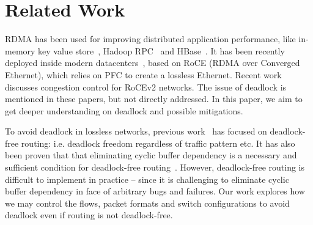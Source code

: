 \secspacelarge
\section{Related Work}
\secspace

 RDMA has been used for improving distributed
application performance, like in-memory key value store~\cite{mitchell13atc,
farm, kalia14sigcomm}, Hadoop RPC~\cite{hadooprdma} and HBase~\cite{hbaserdma}.
It has been recently deployed inside modern
datacenters~\cite{timely,dcqcn,rdmascale}, based on RoCE (RDMA over Converged
Ethernet), which relies on PFC to create a lossless Ethernet.  Recent
work~\cite{timely,dcqcn} discusses congestion control for RoCEv2
networks. The issue of deadlock is mentioned in these papers, but not directly
addressed. In this paper, we aim to get deeper understanding on deadlock and
possible mitigations.

 To avoid deadlock in lossless networks, previous
work~\cite{tcpbolt,karol2003prevention,lash,sancho2004,wu2003fault} has focused
on deadlock-free routing: i.e. deadlock freedom regardless of traffic pattern
etc. It has also been proven that that eliminating cyclic buffer dependency is a
necessary and sufficient condition for deadlock-free
routing~\cite{deadlockfree}. However, deadlock-free routing is difficult to
implement in practice -- since it is challenging to eliminate cyclic buffer
dependency in face of arbitrary bugs and failures. Our work explores how we may
control the flows, packet formats and switch configurations to avoid deadlock
even if routing is not deadlock-free.






